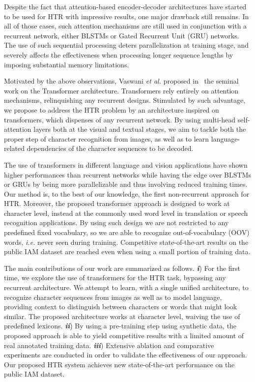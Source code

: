 \documentclass[10pt,twocolumn,letterpaper]{article}
\begin{document}
Despite the fact that attention-based encoder-decoder architectures have started to be used for HTR with impressive results, one major drawback still remains. In all of those cases, such attention mechanisms are still used in conjunction with a recurrent network, either BLSTMs or Gated Recurrent Unit (GRU) networks. The use of such sequential processing deters parallelization at training stage, and severely affects the effectiveness when processing longer sequence lengths by imposing substantial memory limitations.

Motivated by the above observations, Vaswani \emph{et al.} proposed in~\cite{vaswani2017attention} the seminal work on the Transformer architecture. Transformers rely entirely on attention mechanisms, relinquishing any recurrent designs. Stimulated by such advantage, we propose to address the HTR problem by an architecture inspired on transformers, which dispenses of any recurrent network. By using multi-head self-attention layers both at the visual and textual stages, we aim to tackle both the proper step of character recognition from images, as well as to learn language-related dependencies of the character sequences to be decoded.  

The use of transformers in different language and vision applications have shown higher performances than recurrent networks while having the edge over BLSTMs or GRUs by being more parallelizable and thus involving reduced training times. Our method is, to the best of our knowledge, the first non-recurrent approach for HTR. Moreover, the proposed transformer approach is designed to work at character level, instead at the commonly used word level in translation or speech recognition applications. By using such design we are not restricted to any predefined fixed vocabulary, so we are able to recognize  out-of-vocabulary (OOV) words, \emph{i.e.} never seen during training. Competitive state-of-the-art results on the public IAM dataset are reached even when using a small portion of training data.

The main contributions of our work are summarized as follows. \textbf{\textit{i}}) For the first time, we explore the use of transformers for the HTR task, bypassing any recurrent architecture. We attempt to learn, with a single unified architecture, to recognize character sequences from images as well as to model language, providing context to distinguish between characters or words that might look similar. The proposed architecture works at character level, waiving the use of predefined lexicons. \textbf{\textit{ii}}) By using a pre-training step using synthetic data, the proposed approach is able to yield competitive results with a limited amount of real annotated training data. \textbf{\textit{iii}}) Extensive ablation and comparative experiments are conducted in order to validate the effectiveness of our approach. Our proposed HTR system achieves new state-of-the-art performance on the public IAM dataset.
\end{document}
